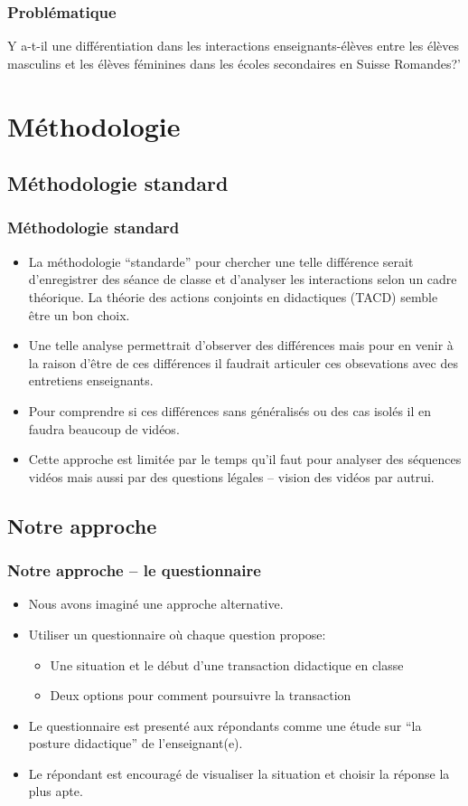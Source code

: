 \documentclass{beamer}
\begin{document}
\begin{frame}
\frametitle{Problématique}
\begin{block}{ }
  Y a-t-il une différentiation dans les interactions enseignants-élèves
  entre les élèves masculins et les élèves féminines dans les écoles
  secondaires en Suisse Romandes?'
\end{block}
\end{frame}

\section{Méthodologie}
\subsection{Méthodologie standard}
\begin{frame}
\frametitle{Méthodologie standard}
\begin{itemize}
\item La méthodologie ``standarde'' pour chercher une telle différence serait d'enregistrer des séance de classe et d'analyser
les interactions selon un cadre théorique. La théorie des actions conjoints en didactiques (TACD) semble être un bon choix.
\item Une telle analyse permettrait d'observer des différences mais pour en venir à la raison d'être de ces différences il faudrait articuler ces obsevations avec des entretiens enseignants.
\item Pour comprendre si ces différences sans généralisés ou des cas isolés il en faudra beaucoup de vidéos.
\item Cette approche est limitée par le temps qu'il faut pour analyser des séquences vidéos mais aussi par des questions
légales -- vision des vidéos par autrui.  
\end{itemize}
\end{frame}

\subsection{Notre approche}
\begin{frame}
\frametitle{Notre approche -- le questionnaire}
\begin{itemize}
\item Nous avons imaginé une approche alternative.
\item Utiliser un questionnaire où chaque question propose:
  \begin{itemize}
   \item Une situation et le début d'une transaction didactique en classe
   \item Deux options pour comment poursuivre la transaction 
  \end{itemize}
\item Le questionnaire est presenté aux répondants comme une étude sur
  ``la posture didactique'' de l'enseignant(e).
\item Le répondant est encouragé de visualiser la situation et choisir la
  réponse la plus apte. 
\end{itemize}
\end{frame}
\end{document}
